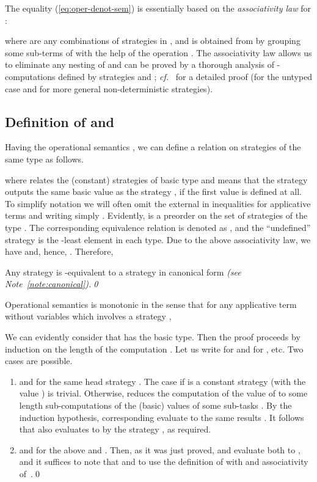 \documentclass[fleqn]{LMCS}
\theoremstyle{plain}\newtheorem{satz}[thm]{Satz}
\theoremstyle{plain}\newtheorem{hyp}[thm]{Hypothesis}
\theoremstyle{plain}\newtheorem{hyps}[thm]{Hypotheses}
\theoremstyle{definition}\newtheorem{note}[thm]{Note}
\def\cf{{\em cf.}}
\newcommand{\?}{\mbox{?}}
\begin{document}
The equality (\ref{eq:oper-denot-sem}) is essentially based on the 
\emph{associativity law} for  
:

where  are  any combinations of strategies in , and  is
obtained from  by grouping some sub-terms of  with the help of
the operation . 
The associativity law allows us to eliminate any nesting of  
and can be proved by a
thorough  analysis of -computations defined by strategies
 and ; \cf~\cite{Saz76SMZH} for a detailed proof 
(for the untyped case and for more general non-deterministic strategies). 


\subsection{Definition of 
\texorpdfstring{  and }{tilde-Q}}
\label{sec:def-of-tQ}

\noindent
Having the operational semantics , we can define a
relation  on strategies of the same type  as follows.

where  relates the (constant) strategies of 
basic type  and 
means that the strategy  outputs 
the same basic value as the strategy , if the first value is
defined at all. 
	To simplify notation we will often omit the external 
	in inequalities  for applicative terms
	 and  writing simply .
Evidently,  is a preorder on the set of strategies 
 of the type . The corresponding
equivalence relation is denoted as , and the ``undefined'' strategy 
 is the
-least element in each type. 
Due to the above associativity law, we
have  and, hence, 
. Therefore, 
\begin{prop}
Any strategy  is -equivalent to a
strategy in canonical form
\em (see Note~\ref{note:canonical}).\qed
\end{prop}
\begin{lem}\label{lemma:monotonic-op-sem}
Operational semantics is monotonic in the sense that 
for any applicative term  without variables 
which involves a strategy , 

\end{lem}
\proof  We can evidently consider that  has the basic type. 
Then the proof proceeds by induction on the length  of the computation 
. 
Let us write  for  and  for , etc. 
Two cases are possible. 
\begin{enumerate}[(1)]
\item 
 and 
 for the same head strategy . 
The case if  is a constant strategy (with the value ) is trivial. 
Otherwise,  reduces
the computation of the value  of  to some length  sub-computations of the
(basic) values  of some sub-tasks . By the induction hypothesis, 
corresponding  evaluate to
the same results . It follows that  also evaluates 
to  by the strategy , as required.
\item 
 and  
for the above  and . 
Then, as
it was just proved,
 and  evaluate both to , 
and it suffices to note that  and to use the 
definition of  with  and associativity 
of~.\qed
\end{enumerate}
\end{document}
